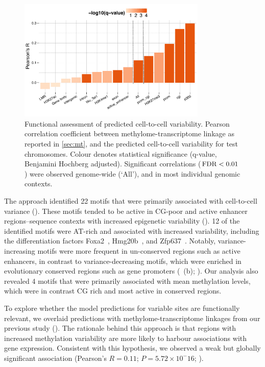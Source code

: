 \begin{figure}[htbp!]
\centering
\includegraphics[width=0.8\textwidth]{var_mt}
\caption[Functional assessment of predicted cell-to-cell variability.]{Functional assessment of predicted cell-to-cell variability. Pearson correlation coefficient between methylome-transcriptome linkage as reported in \cref{sec:mt}, and the predicted cell-to-cell variability for test chromosomes. Colour denotes statistical significance (q-value, Benjamini Hochberg adjusted). Significant correlations ($\operatorname{FDR}<0.01$) were observed  genome-wide (`All'), and in most individual genomic contexts.}
\label{fig:dcpg_var_mt}
\end{figure}

The approach identified 22 motifs that were primarily associated with cell-to-cell variance (). These motifs tended to be active in CG-poor and active enhancer regions--sequence contexts with increased epigenetic variability (). 12 of the identified motifs were AT-rich and associated with increased variability, including the differentiation factors Foxa2~\citep{lee_foxa2_2005,wan_compensatory_2005}, Hmg20b~\citep{sumoy_hmg20a_2000}, and Zfp637~\citep{huang_il-6_2016,quenneville_embryonic_2011}. Notably, variance-increasing motifs were more frequent in un-conserved regions such as active enhancers, in contrast to variance-decreasing motifs, which were enriched in evolutionary conserved regions such as gene promoters (~(b); ). Our analysis also revealed 4 motifs that were primarily associated with mean methylation levels, which were in contrast CG rich and most active in conserved regions.

To explore whether the model predictions for variable sites are functionally relevant, we overlaid predictions with methylome-transcriptome linkages from our previous study (). The rationale behind this approach is that regions with increased methylation variability are more likely to harbour associations with gene expression. Consistent with this hypothesis, we observed a weak but globally significant association (Pearson's $R=0.11$; $P=5.72\times10^-16$; ).

